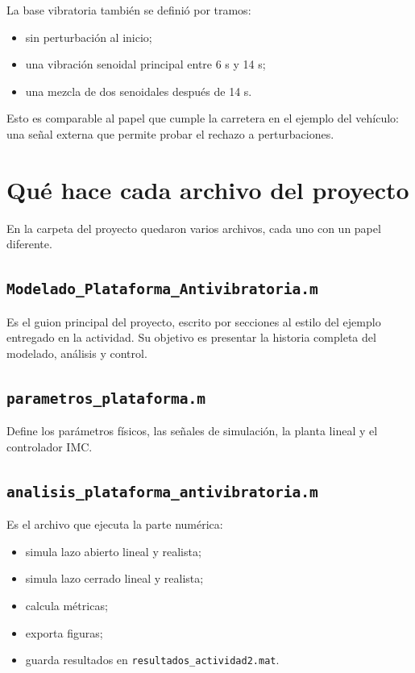 \documentclass[11pt]{article}
\begin{document}
La base vibratoria tambi\'en se defini\'o por tramos:

\begin{itemize}[leftmargin=1.2cm]
\item sin perturbaci\'on al inicio;
\item una vibraci\'on senoidal principal entre 6 s y 14 s;
\item una mezcla de dos senoidales despu\'es de 14 s.
\end{itemize}

Esto es comparable al papel que cumple la carretera en el ejemplo del veh\'iculo: una se\~nal externa que permite probar el rechazo a perturbaciones.

\section{Qu\'e hace cada archivo del proyecto}

En la carpeta del proyecto quedaron varios archivos, cada uno con un papel diferente.

\subsection*{\texttt{Modelado\_Plataforma\_Antivibratoria.m}}

Es el guion principal del proyecto, escrito por secciones al estilo del ejemplo entregado en la actividad. Su objetivo es presentar la historia completa del modelado, an\'alisis y control.

\subsection*{\texttt{parametros\_plataforma.m}}

Define los par\'ametros f\'isicos, las se\~nales de simulaci\'on, la planta lineal y el controlador IMC.

\subsection*{\texttt{analisis\_plataforma\_antivibratoria.m}}

Es el archivo que ejecuta la parte num\'erica:

\begin{itemize}[leftmargin=1.2cm]
\item simula lazo abierto lineal y realista;
\item simula lazo cerrado lineal y realista;
\item calcula m\'etricas;
\item exporta figuras;
\item guarda resultados en \texttt{resultados\_actividad2.mat}.
\end{itemize}
\end{document}
